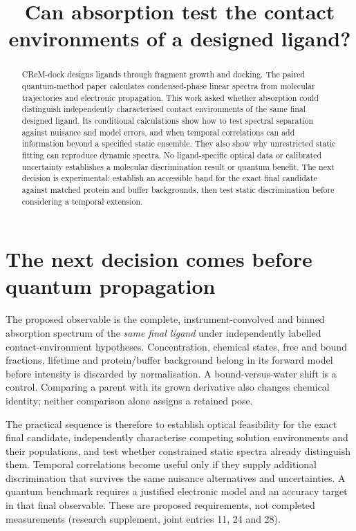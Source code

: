 \documentclass{article}
\title{Can absorption test the contact environments of a designed ligand?}
\begin{document}
\maketitle

\begin{abstract}
CReM-dock designs ligands through fragment growth and docking. The paired quantum-method paper calculates condensed-phase linear spectra from molecular trajectories and electronic propagation. This work asked whether absorption could distinguish independently characterised contact environments of the same final designed ligand. Its conditional calculations show how to test spectral separation against nuisance and model errors, and when temporal correlations can add information beyond a specified static ensemble. They also show why unrestricted static fitting can reproduce dynamic spectra. No ligand-specific optical data or calibrated uncertainty establishes a molecular discrimination result or quantum benefit. The next decision is experimental: establish an accessible band for the exact final candidate against matched protein and buffer backgrounds, then test static discrimination before considering a temporal extension.
\end{abstract}

\section{The next decision comes before quantum propagation}

The proposed observable is the complete, instrument-convolved and binned absorption spectrum of the \emph{same final ligand} under independently labelled contact-environment hypotheses. Concentration, chemical states, free and bound fractions, lifetime and protein/buffer background belong in its forward model before intensity is discarded by normalisation. A bound-versus-water shift is a control. Comparing a parent with its grown derivative also changes chemical identity; neither comparison alone assigns a retained pose.

The practical sequence is therefore to establish optical feasibility for the exact final candidate, independently characterise competing solution environments and their populations, and test whether constrained static spectra already distinguish them. Temporal correlations become useful only if they supply additional discrimination that survives the same nuisance alternatives and uncertainties. A quantum benchmark requires a justified electronic model and an accuracy target in that final observable. These are proposed requirements, not completed measurements (research supplement, joint entries 11, 24 and 28).
\end{document}
